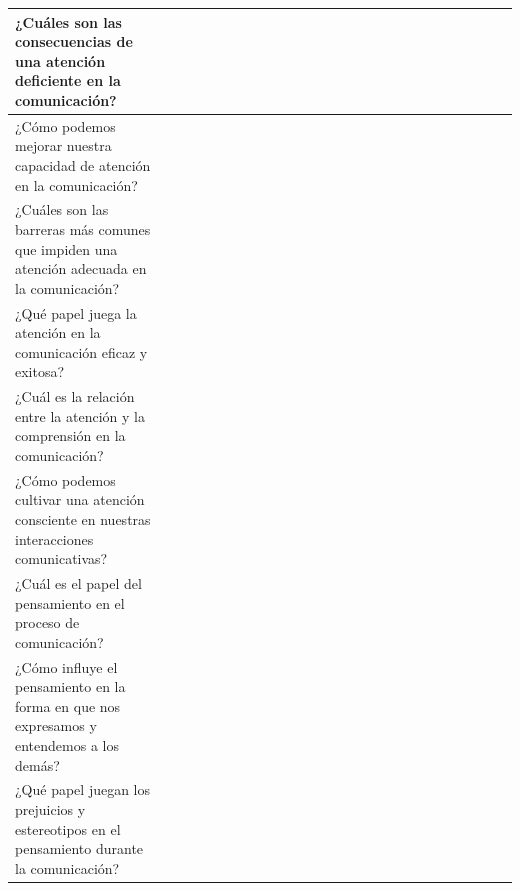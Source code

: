 \documentclass[12pt,a4paper]{article}
\begin{document}
\begin{landscape}
\begin{table}[ht!]
\begin{tabular}{|l|l|l|l|l|l|l|l|l|l|l|l|l|l|l|l|l|l|l|l|l|l|l|l|l|l|}
			¿Cuáles son las consecuencias de una atención deficiente en la comunicación?                           &                                          &    &    &    &    &    &    &    &    &     &     &     &     &     &     &     &     &     &     &     &           \\\hline
			¿Cómo podemos mejorar nuestra capacidad de atención en la comunicación?                                &                                          &    &    &    &    &    &    &    &    &     &     &     &     &     &     &     &     &     &     &     &           \\\hline
			¿Cuáles son las barreras más comunes que impiden una atención adecuada en la comunicación?             &                                          &    &    &    &    &    &    &    &    &     &     &     &     &     &     &     &     &     &     &     &           \\\hline
			¿Qué papel juega la atención en la comunicación eficaz y exitosa?                                      &                                          &    &    &    &    &    &    &    &    &     &     &     &     &     &     &     &     &     &     &     &           \\\hline
			¿Cuál es la relación entre la atención y la comprensión en la comunicación?                            &                                          &    &    &    &    &    &    &    &    &     &     &     &     &     &     &     &     &     &     &     &           \\\hline
			¿Cómo podemos cultivar una atención consciente en nuestras interacciones comunicativas?                &                                          &    &    &    &    &    &    &    &    &     &     &     &     &     &     &     &     &     &     &     &           \\\hline
			¿Cuál es el papel del pensamiento en el proceso de comunicación?                                       &                                          &    &    &    &    &    &    &    &    &     &     &     &     &     &     &     &     &     &     &     &           \\\hline
			¿Cómo influye el pensamiento en la forma en que nos expresamos y entendemos a los demás?               &                                          &    &    &    &    &    &    &    &    &     &     &     &     &     &     &     &     &     &     &     &           \\\hline
			¿Qué papel juegan los prejuicios y estereotipos en el pensamiento durante la comunicación?             &                                          &    &    &    &    &    &    &    &    &     &     &     &     &     &     &     &     &     &     &     &           \\\hline

\end{tabular}
\end{table}
\end{landscape}
\end{document}
